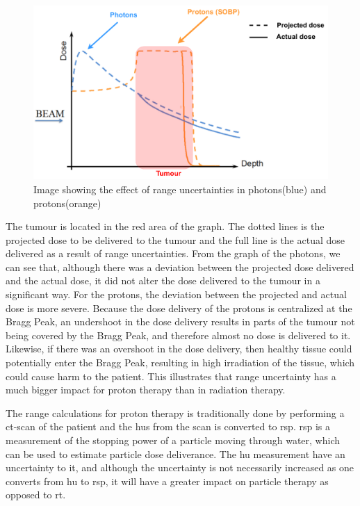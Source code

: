 \documentclass[main.tex]{subfiles}
\begin{document}
\begin{figure}[!htpb]
    \centering
    \includegraphics[width=12cm ]{images/projected_dose_graph.pdf}
    \caption{Image showing the effect of range uncertainties in photons(blue) and protons(orange)\cite{proton_challenges}}
    \label{fig: proton_uncertainty}
\end{figure}
\FloatBarrier


The tumour is located in the red area of the graph. The dotted lines is the projected dose to be delivered to the tumour and the full line is the actual dose delivered as a result of range uncertainties. From the graph of the photons, we can see that, although there was a deviation between the projected dose delivered and the actual dose, it did not alter the dose delivered to the tumour in a significant way. For the protons, the deviation between the projected and actual dose is more severe. Because the dose delivery of the protons is centralized at the Bragg Peak, an undershoot in the dose delivery results in parts of the tumour not being covered by the Bragg Peak, and therefore almost no dose is delivered to it. Likewise, if there was an overshoot in the dose delivery, then healthy tissue could potentially enter the Bragg Peak, resulting in high irradiation of the tissue, which could cause harm to the patient. This illustrates that range uncertainty has a much bigger impact for proton therapy than in radiation therapy.

The range calculations for proton therapy is traditionally done by performing a \gls{ct}-scan of the patient and the \acrlong{hu}s from the scan is converted to \acrlong{rsp}. \gls{rsp} is a measurement of the stopping power of a particle moving through water, which can be used to estimate particle dose deliverance. The \gls{hu} measurement have an uncertainty to it, and although the uncertainty is not necessarily increased as one converts from \gls{hu} to \gls{rsp}, it will have a greater impact on particle therapy as opposed to \gls{rt}\cite{proton_challenges}.
\end{document}
